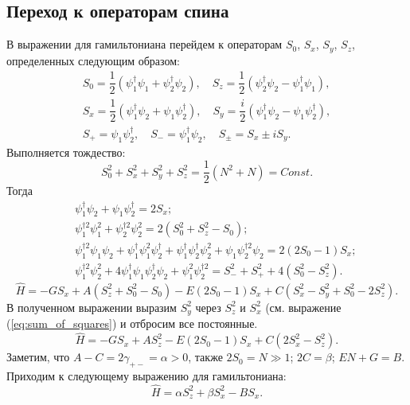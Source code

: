 \documentclass[12pt]{article}
\begin{document}
\subsection*{Переход к операторам спина}

В выражении для гамильтониана перейдем к операторам $S_0$, $S_x$, $S_y$, $S_z$, определенных следующим образом:
%
\begin{equation}
\begin{array}{c}
	S_0 = \dfrac{1}{2} (\psi_1^\dag \psi_1 + \psi_2^\dag \psi_2), \quad S_z = \dfrac{1}{2} (\psi_2^\dag \psi_2 - \psi_1^\dag \psi_1), \\[10pt]
	S_x = \dfrac{1}{2} (\psi_1^\dag \psi_2 + \psi_1 \psi_2^\dag), \quad S_y = \dfrac{i}{2} (\psi_1^\dag \psi_2 - \psi_1 \psi_2^\dag), \\[10pt]
	S_+ = \psi_1 \psi_2^\dag, \quad S_- = \psi_1^\dag \psi_2, \quad S_{\pm} = S_x \pm iS_y.
\end{array}
\end{equation}
%
Выполняется тождество:
%
\begin{equation}
S_0^2 + S_x^2 + S_y^2 + S_z^2 = \dfrac{1}{2}(N^2 + N) = Const.
\label{eq:sum_of_squares}
\end{equation}
%
Тогда
%
\begin{eqnarray*}
&& \psi_1^\dag \psi_2 + \psi_1 \psi_2^\dag = 2S_x; \\
&& \psi_1^{\dag 2} \psi_1^2 + \psi_2^{\dag 2} \psi_2^2 = 2(S_0^2 + S_z^2 - S_0); \\
&& \psi_1^{\dag 2} \psi_1 \psi_2 + \psi_1^\dag \psi_1^2 \psi_2^\dag + \psi_1^\dag \psi_2^\dag \psi_2^2 + \psi_1 \psi_2^{\dag 2} \psi_2 = 2(2S_0 - 1) S_x; \\
&& \psi_1^{\dag 2} \psi_2^2 + 4 \psi_1^\dag \psi_1 \psi_2^\dag \psi_2 + \psi_1^2 \psi_2^{\dag 2} = S_-^2 + S_+^2 + 4(S_0^2 - S_z^2).
\end{eqnarray*}
%
%
$$\hat{H} = -G S_x + A(S_z^2 + S_0^2 - S_0) - E(2S_0 - 1) S_x + C(S_x^2 - S_y^2 + S_0^2 - 2S_z^2).$$
%
В полученном выражении выразим $S_y^2$ через $S_z^2$ и $S_x^2$ (см. выражение (\ref{eq:sum_of_squares}) и отбросим все постоянные.
%
$$\hat{H} = -G S_x + A S_z^2 - E(2S_0 - 1) S_x + C(2 S_x^2 - S_z^2).$$
%
Заметим, что $A - C = 2 \gamma_{+-} = \alpha > 0$, также $2S_0 = N \gg 1$; $2C = \beta$; $EN+G = B$.
Приходим к следующему выражению для гамильтониана:
%
\begin{equation}
\hat{H} = \alpha S_z^2 + \beta S_x^2 - B S_x.
\label{eq:spin_hamiltonian}
\end{equation}
\end{document}
